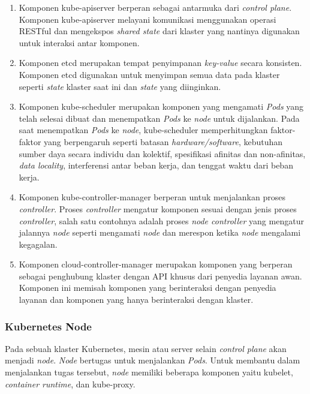 \begin{enumerate}
  
  \item Komponen kube-apiserver berperan sebagai antarmuka dari \emph{control plane}.
    Komponen kube-apiserver melayani komunikasi menggunakan operasi RESTful dan
    mengekspos \emph{shared state} dari klaster yang nantinya digunakan untuk
    interaksi antar komponen.

  \item Komponen etcd merupakan tempat penyimpanan \emph{key-value} secara konsisten.
    Komponen etcd digunakan untuk menyimpan semua data pada klaster seperti \emph{state}
    klaster saat ini dan \emph{state} yang diinginkan.

  \item Komponen kube-scheduler merupakan komponen yang mengamati \emph{Pods} yang telah
    selesai dibuat dan menempatkan \emph{Pods} ke \emph{node} untuk dijalankan. Pada saat
    menempatkan \emph{Pods} ke \emph{node}, kube-scheduler memperhitungkan faktor-faktor
    yang berpengaruh seperti batasan \emph{hardware/software}, kebutuhan sumber daya secara
    individu dan kolektif, spesifikasi afinitas dan non-afinitas, \emph{data locality}, interferensi
    antar beban kerja, dan tenggat waktu dari beban kerja.

  \item Komponen kube-controller-manager berperan untuk menjalankan proses \emph{controller}.
    Proses \emph{controller} mengatur komponen sesuai dengan jenis proses \emph{controller},
    salah satu contohnya adalah proses \emph{node controller} yang mengatur jalannya \emph{node}
    seperti mengamati \emph{node} dan merespon ketika \emph{node} mengalami kegagalan.

  \item Komponen cloud-controller-manager merupakan komponen yang berperan sebagai penghubung
    klaster dengan API khusus dari penyedia layanan awan. Komponen ini memisah
    komponen yang berinteraksi dengan penyedia layanan dan komponen yang hanya berinteraksi dengan
    klaster.

\end{enumerate}

\subsubsection{Kubernetes Node}

Pada sebuah klaster Kubernetes, mesin atau server selain \emph{control plane} akan menjadi \emph{node}.
\emph{Node} bertugas untuk menjalankan \emph{Pods}. Untuk membantu dalam menjalankan tugas tersebut, \emph{node}
memiliki beberapa komponen yaitu kubelet, \emph{container runtime}, dan kube-proxy.

